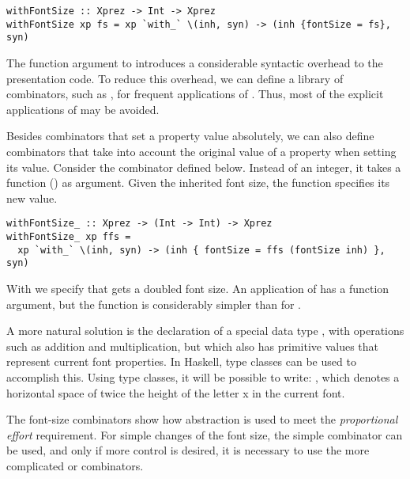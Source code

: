 \begin{small}
\begin{verbatim}
withFontSize :: Xprez -> Int -> Xprez
withFontSize xp fs = xp `with_` \(inh, syn) -> (inh {fontSize = fs}, syn)
\end{verbatim}
\end{small}

The function argument to  introduces a considerable syntactic overhead to the presentation code. To reduce this overhead, we can define a library of combinators, such as , for frequent applications of  . Thus, most of the explicit applications of  may be avoided.

Besides combinators that set a property value absolutely, we can also define combinators that take into account the original value of a property when setting its value. Consider the combinator  defined below. Instead of an integer, it takes a function () as argument. Given the inherited font size, the function  specifies its new value.

\begin{small}
\begin{verbatim}
withFontSize_ :: Xprez -> (Int -> Int) -> Xprez
withFontSize_ xp ffs = 
  xp `with_` \(inh, syn) -> (inh { fontSize = ffs (fontSize inh) }, syn)
\end{verbatim}
\end{small}

With  we specify that  gets a doubled font size. An application of  has a function argument, but the function is considerably simpler than for . 

\bc A more natural solution is the declaration of a special data type , with operations such as addition and multiplication, but which also has primitive values that represent current font properties. In Haskell, type classes can be used to accomplish this. Using type classes, it will be possible to write: , which denotes a horizontal space of twice the height of the letter x in the current font.\ec 


The font-size combinators show how abstraction is used to meet the {\em proportional effort} requirement. For simple changes of the font size, the simple  combinator can be used, and only if more control is desired, it is necessary to use the more complicated  or  combinators.

